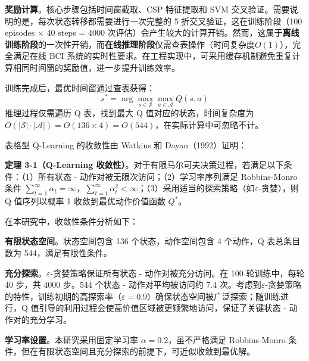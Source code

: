 \textbf{奖励计算}。核心步骤包括时间窗截取、CSP 特征提取和 SVM 交叉验证。需要说明的是，每次状态转移都需要进行一次完整的 5 折交叉验证，这在训练阶段（100 episodes × 40 steps = 4000 次评估）会产生较大的计算开销。然而，这属于\textbf{离线训练阶段}的一次性开销，而\textbf{在线推理阶段}仅需查表操作（时间复杂度$O(1)$），完全满足在线 BCI 系统的实时性要求。在工程实现中，可采用缓存机制避免重复计算相同时间窗的奖励值，进一步提升训练效率。


\label{subsec:inference}

训练完成后，最优时间窗通过查表获得：
\begin{equation}
s^* = \arg\max_{s \in \mathcal{S}} \max_{a \in \mathcal{A}} Q(s, a)
\end{equation}
推理过程仅需遍历 Q 表，找到最大 Q 值对应的状态，时间复杂度为 $O(|\mathcal{S}| \cdot |\mathcal{A}|) = O(136 \times 4) = O(544)$，在实际计算中可忽略不计。

\label{sec:convergence}

\label{subsec:theorem}

表格型 Q-Learning 的收敛性由 Watkins 和 Dayan（1992）证明\cite{watkins1992q}：

\textbf{定理 3-1（Q-Learning 收敛性）}。对于有限马尔可夫决策过程，若满足以下条件：（1）所有状态 - 动作对被无限次访问；（2）学习率序列满足 Robbins-Monro 条件 $\sum_{t=1}^{\infty} \alpha_t = \infty$，$\sum_{t=1}^{\infty} \alpha_t^2 < \infty$；（3）采用适当的探索策略（如$\varepsilon$-贪婪），则 Q 值序列以概率 1 收敛到最优动作价值函数 $Q^*$。

\label{subsec:convergence_guarantee}

在本研究中，收敛性条件分析如下：

\textbf{有限状态空间}。状态空间包含 136 个状态，动作空间包含 4 个动作，Q 表总条目数为 544，满足有限性条件。

\textbf{充分探索}。$\varepsilon$-贪婪策略保证所有状态 - 动作对被充分访问。在 100 轮训练中，每轮 40 步，共 4000 步。544 个状态 - 动作对平均被访问约 7.4 次。考虑到$\varepsilon$-贪婪策略的特性，训练初期的高探索率（$\varepsilon = 0.9$）确保状态空间被广泛探索；随训练进行，Q 值引导的利用过程会使高价值区域被更频繁地访问，保证了关键状态 - 动作对的充分学习。

\textbf{学习率设置}。本研究采用固定学习率 $\alpha = 0.2$，虽不严格满足 Robbins-Monro 条件，但在有限状态空间且充分探索的前提下，可近似收敛到最优解。

